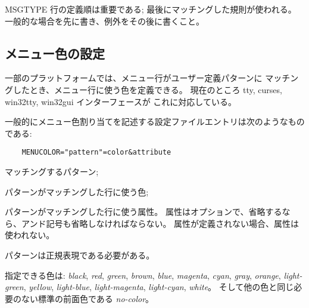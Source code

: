 MSGTYPE 行の定義順は重要である; 最後にマッチングした規則が使われる。
一般的な場合を先に書き、例外をその後に書くこと。


\subsection*{メニュー色の設定}

一部のプラットフォームでは、メニュー行がユーザー定義パターンに
マッチングしたとき、メニュー行に使う色を定義できる。
現在のところ tty, curses, win32tty, win32gui インターフェースが
これに対応している。

一般的にメニュー色割り当てを記述する設定ファイルエントリは次のようなものである:
\begin{verbatim}
    MENUCOLOR="pattern"=color&attribute
\end{verbatim}

\blist{}
\item[\ib{pattern}]
マッチングするパターン;
\item[\ib{color}]
パターンがマッチングした行に使う色;
\item[\ib{attribute}]
パターンがマッチングした行に使う属性。
属性はオプションで、省略するなら、アンド記号も省略しなければならない。
属性が定義されない場合、属性は使われない。
\elist

パターンは正規表現である必要がある。

指定できる色は:
{\it black}, {\it red}, {\it green}, {\it brown},
{\it blue}, {\it magenta}, {\it cyan}, {\it gray}, {\it orange},
{\it light-green}, {\it yellow}, {\it light-blue}, {\it light-magenta},
{\it light-cyan}, {\it white}。
そして他の色と同じ必要のない標準の前面色である {\it no-color}。

